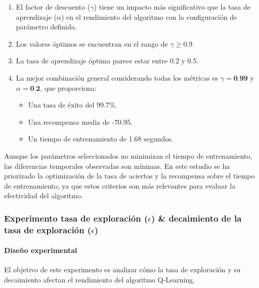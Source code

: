 \begin{enumerate}
    \item El factor de descuento ($\gamma$) tiene un impacto más significativo que la tasa de aprendizaje ($\alpha$) en el rendimiento del algoritmo con la configuración de parámetro definida.
    \item Los valores óptimos se encuentran en el rango de $\gamma \geq 0.9$.
    \item La tasa de aprendizaje óptima parece estar entre 0.2 y 0.5.
    \item La mejor combinación general considerando todas los métricas es $\gamma = \textbf{0.99}$ y $\alpha = \textbf{0.2}$, que proporciona:
    \begin{itemize}
        \item Una tasa de éxito del 99.7\%.
        \item Una recompensa media de -70.95.
        \item Un tiempo de entrenamiento de 1.68 segundos.
    \end{itemize}
\end{enumerate}

Aunque los parámetros seleccionados no minimizan el tiempo de entrenamiento, las diferencias temporales observadas son mínimas. En este estudio se ha priorizado la optimización de la tasa de aciertos y la recompensa sobre el tiempo de entrenamiento, ya que estos criterios son más relevantes para evaluar la efectividad del algoritmo.

\newpage
\subsubsection{Experimento tasa de exploración (\(\epsilon\)) \& decaimiento de la tasa de exploración (\(\epsilon\))}

\paragraph{Diseño experimental}
El objetivo de este experimento es analizar cómo la tasa de exploración y su decaimiento afectan el rendimiento del algoritmo Q-Learning.

